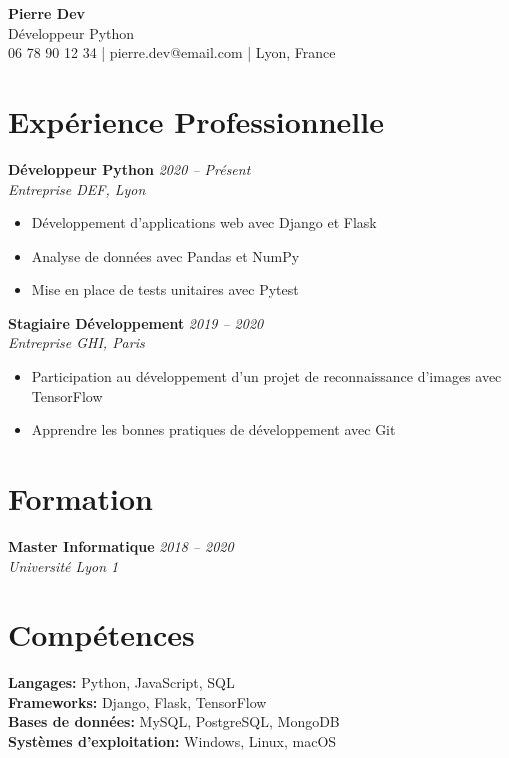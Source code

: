 \documentclass[11pt,a4paper]{article}
\begin{document}
\begin{center}
    {\Huge\textbf{Pierre Dev}}\\[0.4cm]
    {\large Développeur Python}\\[0.3cm]
    06 78 90 12 34 | pierre.dev@email.com | Lyon, France
\end{center}

\section{Expérience Professionnelle}

\textbf{Développeur Python} \hfill \textit{2020 -- Présent}\\
\textit{Entreprise DEF, Lyon}
\begin{itemize}[noitemsep, topsep=3pt]
    \item Développement d'applications web avec Django et Flask
    \item Analyse de données avec Pandas et NumPy
    \item Mise en place de tests unitaires avec Pytest
\end{itemize}

\textbf{Stagiaire Développement} \hfill \textit{2019 -- 2020}\\
\textit{Entreprise GHI, Paris}
\begin{itemize}[noitemsep, topsep=3pt]
    \item Participation au développement d'un projet de reconnaissance d'images avec TensorFlow
    \item Apprendre les bonnes pratiques de développement avec Git
\end{itemize}

\section{Formation}

\textbf{Master Informatique} \hfill \textit{2018 -- 2020}\\
\textit{Université Lyon 1}

\section{Compétences}

\textbf{Langages:} Python, JavaScript, SQL\\
\textbf{Frameworks:} Django, Flask, TensorFlow\\
\textbf{Bases de données:} MySQL, PostgreSQL, MongoDB\\
\textbf{Systèmes d'exploitation:} Windows, Linux, macOS
\end{document}
